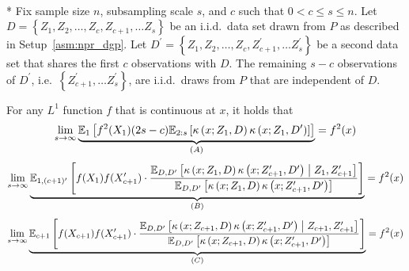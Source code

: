 \begin{lem}[]\label{lem:double_cond3}\mbox{}\\*
    Fix sample size $n$, subsampling scale $s$, and $c$ such that $0 < c \leq s \leq n$.
	Let $D = \left\{Z_1, Z_2, \dotsc, Z_c, Z_{c+1}, \dotsc Z_s \right\}$ be an i.i.d.\ data set drawn from $P$ as described in Setup~\ref{asm:npr_dgp}.
	Let $D^{\prime} = \left\{Z_1, Z_2, \dotsc, Z_c, Z_{c+1}^{\prime}, \dotsc Z_s^{\prime} \right\}$ be a second data set that shares the first $c$ observations with $D$.
	The remaining $s - c$ observations of $D^{\prime}$, i.e.\ $\left\{Z_{c+1}^{\prime}, \dotsc Z_s^{\prime} \right\}$, are i.i.d.\ draws from $P$ that are independent of $D$.

    For any $L^1$ function $f$ that is continuous at $x$, it holds that
        \begin{equation}
        \lim_{s \rightarrow \infty} \underbrace{\mathbb{E}_{1}\left[f^{2}(X_{1}) (2s - c) 
            \mathbb{E}_{2:s}\left[\kappa\left(x; Z_{1}, D\right)\kappa\left(x; Z_{1}, D^{\prime}\right)\right]
        \right]}_{(A)}
        = f^{2}(x)
    \end{equation}
    \begin{equation}
        \lim_{s \rightarrow \infty} \underbrace{\mathbb{E}_{1, (c+1)^{\prime}}\left[
            f(X_{1}) f(X_{c+1}^{\prime})
            \cdot \frac{\mathbb{E}_{D, D^{\prime}}\left[\kappa\left(x; Z_{1}, D\right)\kappa\left(x; Z_{c+1}^{\prime}, D^{\prime}\right) \; \middle| \; Z_{1}, Z_{c+1}^{\prime}\right]}{\mathbb{E}_{D, D^{\prime}}\left[\kappa\left(x; Z_{1}, D\right)\kappa\left(x; Z_{c+1}^{\prime}, D^{\prime}\right)\right]}
        \right]}_{(B)}
        = f^{2}(x)
    \end{equation}
    \begin{equation}
        \lim_{s \rightarrow \infty} \underbrace{\mathbb{E}_{c+1}\left[
            f(X_{c+1}) f(X_{c+1}^{\prime})
            \cdot \frac{\mathbb{E}_{D, D^{\prime}}\left[\kappa\left(x; Z_{c+1}, D\right)\kappa\left(x; Z_{c+1}^{\prime}, D^{\prime}\right) \; \middle| \; Z_{c+1}, Z_{c+1}^{\prime}\right]}{\mathbb{E}_{D, D^{\prime}}\left[\kappa\left(x; Z_{c+1}, D\right)\kappa\left(x; Z_{c+1}^{\prime}, D^{\prime}\right)\right]} 
        \right]}_{(C)}
        = f^{2}(x)
    \end{equation}
\end{lem}

